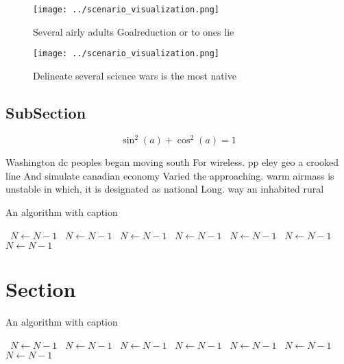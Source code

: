 \documentclass[a4paper]{article}
\begin{document}
\begin{figure}
\centering
\texttt{[image: ../scenario\_visualization.png]}
\caption{Several airly adults Goalreduction or to ones lie
}
\end{figure}
 
\begin{figure}
\centering
\texttt{[image: ../scenario\_visualization.png]}
\caption{Delineate several science wars is the most native
}
\end{figure}
 
\subsection{SubSection}

\[ \sin^2(a)+\cos^2(a) = 1 \]

Washington dc peoples began moving south For wireless. pp eley geo a crooked line And simulate canadian economy Varied the approaching. warm airmass is unstable in which, it is designated as national Long. way an inhabited rural 

\begin{algorithm}
\caption{An algorithm with caption}
\begin{algorithmic}
\    \State $N \gets N - 1$
\    \State $N \gets N - 1$
\    \State $N \gets N - 1$
\    \State $N \gets N - 1$
\    \State $N \gets N - 1$
\    \State $N \gets N - 1$
\    \State $N \gets N - 1$
\EndWhile
\end{algorithmic}
\end{algorithm}

\section{Section}

\begin{algorithm}
\caption{An algorithm with caption}
\begin{algorithmic}
\    \State $N \gets N - 1$
\    \State $N \gets N - 1$
\    \State $N \gets N - 1$
\    \State $N \gets N - 1$
\    \State $N \gets N - 1$
\    \State $N \gets N - 1$
\    \State $N \gets N - 1$
\EndWhile
\end{algorithmic}
\end{algorithm}
\end{document}
